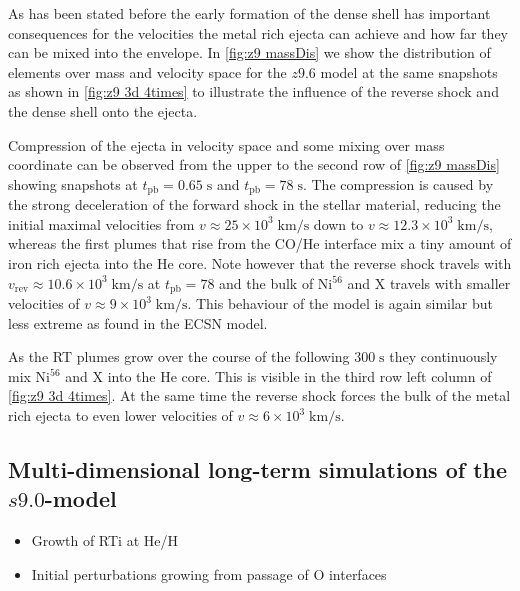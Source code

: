 \documentclass[fleqn,usenatbib]{mnras}
\newcommand{\nickel}{$\mathrm{Ni^{56}}$\xspace}
\newcommand{\tracer}{$\mathrm{X}$\xspace}
\newcommand{\COM}[1]{{\color{red}#1}}
\begin{document}
As has been stated before the early formation of the dense shell has important consequences for the velocities the metal rich ejecta can achieve and how far they can be mixed into the envelope.
In \autoref{fig:z9 massDis} we show the distribution of elements over mass and velocity space for the $z9.6$ model at the same snapshots as shown in \autoref{fig:z9 3d  4times} to illustrate the influence of the reverse shock and the dense shell onto the ejecta.

Compression of the ejecta in velocity space and some mixing over mass coordinate can be observed from the upper to the second row of \autoref{fig:z9 massDis} showing snapshots at $t_{\mathrm{pb}}=0.65\;\mathrm{s}$ and $t_{\mathrm{pb}}=78\;\mathrm{s}$. The compression is caused by the strong deceleration of the forward shock in the stellar material, reducing the initial maximal velocities from $v\approx 25\times10^3\;\mathrm{km/s}$ down to $v\approx 12.3\times10^3\;\mathrm{km/s}$, whereas the first plumes that rise from the CO/He interface mix a tiny amount of iron rich ejecta into the He core. Note however that the reverse shock travels with $v_{\mathrm{rev}}\approx 10.6\times10^3\;\mathrm{km/s}$ at $t_{\mathrm{pb}}=78$ and the bulk of \nickel and \tracer travels with smaller velocities of $v\approx 9\times10^3\;\mathrm{km/s}$. This behaviour of the model is again similar but less extreme as found in the ECSN model.

As the RT plumes grow over the course of the following $300\;\mathrm{s}$ they continuously mix \nickel and \tracer into the He core. This is visible in the third row left column of \autoref{fig:z9 3d 4times}. At the same time the reverse shock forces the bulk of the metal rich ejecta to even lower velocities of  $v\approx 6\times10^3\;\mathrm{km/s}$. 

\subsection{Multi-dimensional long-term simulations of the $s9.0$-model}
\label{subsec:Multi-dimensional long-term simulations of the s9.0-model}
\COM{
\begin{itemize}
    \item Growth of RTi at He/H
    \item Initial perturbations growing from passage of O interfaces
\end{itemize}
}
\end{document}
